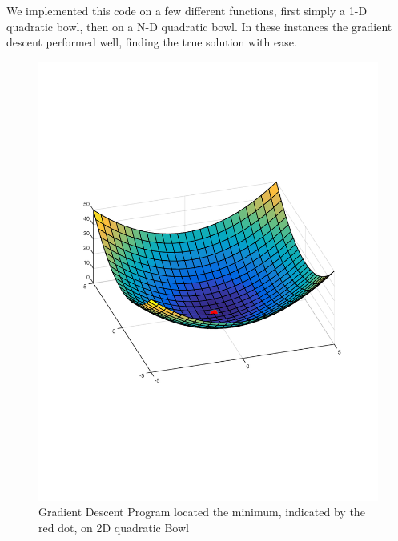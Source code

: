 \documentclass[10pt,twocolumn]{article}
\begin{document}
We implemented this code on a few different functions, first simply a 1-D quadratic bowl, then on a N-D quadratic bowl. In these instances the gradient descent performed well, finding the true solution with ease.  
\begin{figure}[H]
\center
\includegraphics[scale =.4]{2DQuadBowl.pdf}
\caption{Gradient Descent Program located the minimum, indicated by the red dot, on 2D quadratic Bowl}
\end{figure}
\end{document}
